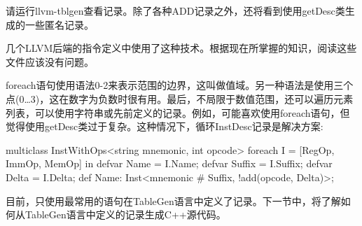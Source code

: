 请运行llvm-tblgen查看记录。除了各种ADD记录之外，还将看到使用getDesc类生成的一些匿名记录。

几个LLVM后端的指令定义中使用了这种技术。根据现在所掌握的知识，阅读这些文件应该没有问题。

foreach语句使用语法0-2来表示范围的边界，这叫做值域。另一种语法是使用三个点(0…3)，这在数字为负数时很有用。最后，不局限于数值范围，还可以遍历元素列表，可以使用字符串或先前定义的记录。例如，可能喜欢使用foreach语句，但觉得使用getDesc类过于复杂。这种情况下，循环InstDesc记录是解决方案:

\begin{shell}
multiclass InstWithOps<string mnemonic, int opcode> {
    foreach I = [RegOp, ImmOp, MemOp] in {
        defvar Name = I.Name;
        defvar Suffix = I.Suffix;
        defvar Delta = I.Delta;
        def Name: Inst<mnemonic # Suffix, !add(opcode, Delta)>;
    }
}
\end{shell}

目前，只使用最常用的语句在TableGen语言中定义了记录。下一节中，将了解如何从TableGen语言中定义的记录生成C++源代码。





